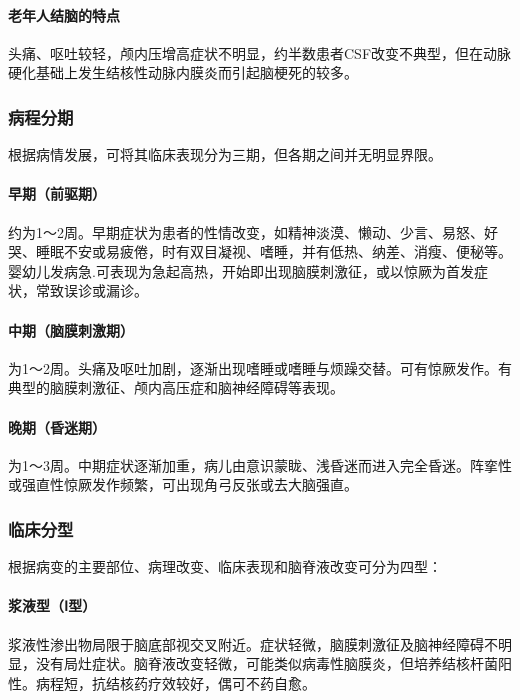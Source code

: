 \paragraph{老年人结脑的特点}

头痛、呕吐较轻，颅内压增高症状不明显，约半数患者CSF改变不典型，但在动脉硬化基础上发生结核性动脉内膜炎而引起脑梗死的较多。

\subsubsection{病程分期}

根据病情发展，可将其临床表现分为三期，但各期之间并无明显界限。

\paragraph{早期（前驱期）}

约为1～2周。早期症状为患者的性情改变，如精神淡漠、懒动、少言、易怒、好哭、睡眠不安或易疲倦，时有双目凝视、嗜睡，并有低热、纳差、消瘦、便秘等。婴幼儿发病急.可表现为急起高热，开始即出现脑膜刺激征，或以惊厥为首发症状，常致误诊或漏诊。

\paragraph{中期（脑膜刺激期）}

为1～2周。头痛及呕吐加剧，逐渐出现嗜睡或嗜睡与烦躁交替。可有惊厥发作。有典型的脑膜刺激征、颅内高压症和脑神经障碍等表现。

\paragraph{晚期（昏迷期）}

为1～3周。中期症状逐渐加重，病儿由意识蒙眬、浅昏迷而进入完全昏迷。阵挛性或强直性惊厥发作频繁，可出现角弓反张或去大脑强直。

\subsubsection{临床分型}

根据病变的主要部位、病理改变、临床表现和脑脊液改变可分为四型：

\paragraph{浆液型（Ⅰ型）}

浆液性渗出物局限于脑底部视交叉附近。症状轻微，脑膜刺激征及脑神经障碍不明显，没有局灶症状。脑脊液改变轻微，可能类似病毒性脑膜炎，但培养结核杆菌阳性。病程短，抗结核药疗效较好，偶可不药自愈。

